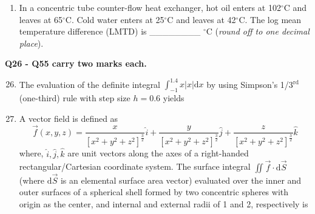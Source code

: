 \documentclass[12pt,onecolumn]{article}
\begin{document}
\begin{enumerate}
    \item In a concentric tube counter-flow heat exchanger, hot oil enters at 102$^\circ$C and leaves at 65$^\circ$C. Cold water enters at 25$^\circ$C and leaves at 42$^\circ$C. The log mean temperature difference (LMTD) is \_\_\_\_\_\_\_\_ $^\circ$C (\textit{round off to one decimal place}).
\end{enumerate}

\noindent\textbf{Q26 - Q55 carry two marks each.}
\begin{enumerate}
    \setcounter{enumi}{25}
    \item The evaluation of the definite integral $\int_{-1}^{1.4}x|x| \mathrm{d}x$ by using Simpson's 1/3$^\text{rd}$ (one-third) rule with step size $h=0.6$ yields
          \begin{enumerate}
          \end{enumerate}

    \item A vector field is defined as
          \[
              \vec{f}(x, y, z) = \frac{x}{\left[x^2+y^2+z^2\right]^{\frac{3}{2}}}\hat{i} + \frac{y}{\left[x^2+y^2+z^2\right]^{\frac{3}{2}}}\hat{j} + \frac{z}{\left[x^2+y^2+z^2\right]^{\frac{3}{2}}}\hat{k}
          \] where, $\hat{i}, \hat{j}, \hat{k}$ are unit vectors along the axes of a right-handed rectangular/Cartesian coordinate system. The surface integral $\iint \vec{f}\cdot\mathrm{d}\vec{S}$ (where $\mathrm{d}\vec{S}$ is an elemental surface area vector) evaluated over the inner and outer surfaces of a spherical shell formed by two concentric spheres with origin as the center, and internal and external radii of 1 and 2, respectively is
          \begin{enumerate}
          \end{enumerate}


\end{enumerate}
\end{document}
